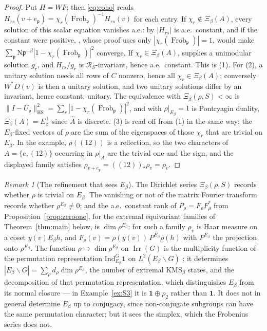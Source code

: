 \documentclass[11pt]{amsart}
\numberwithin{equation}{section}
\theoremstyle{definition}
\theoremstyle{remark}
\newtheorem{remark}[theorem]{Remark}
\newcommand{\cR}{\mathcal{R}}
\newcommand{\pp}{\mathfrak{p}}
\newcommand{\Ns}{\mathrm{N}}
\newcommand{\Frob}{\operatorname{Frob}}
\newcommand{\Irr}{\operatorname{Irr}}
\newcommand{\HS}{\mathrm{HS}}
\begin{document}
\begin{proof}
Put $H=WF$; then \eqref{eq:coho} reads $H_{rs}(v+e_\pp)=\chi_r(\Frob_\pp)^{-1}H_{rs}(v)$ for
each entry. If $\chi_r\notin\Xi_\beta(A)$, every solution of this scalar equation vanishes
a.e.: by \cite[Lem.~3.1]{Main} $|H_{rs}|$ is a.e.\ constant, and if the constant were
positive, \cite[Prop.~3.3]{Main}, whose proof uses only $|\chi_r(\Frob_\pp)|=1$, would make
$\sum_\pp\Ns\pp^{-\beta}|1-\chi_r(\Frob_\pp)|^2$ converge. If $\chi_r\in\Xi_\beta(A)$,
\cite[Prop.~3.4]{Main} supplies a unimodular solution $g_r$, and $H_{rs}/g_r$ is
$\cR_S$-invariant, hence a.e.\ constant. This is (1). For (2), a unitary solution needs all
rows of $C$ nonzero, hence all $\chi_r\in\Xi_\beta(A)$; conversely $W^*D(v)$ is then a
unitary solution, and two unitary solutions differ by an invariant, hence constant, unitary.
The equivalence with $\Xi_\beta(\rho,S)<\infty$ is $\|I-U_\pp\|_{\HS}^2=\sum_r|1-\chi_r(\Frob_\pp)|^2$,
and with $\rho|_{E_\beta}=1$ is Pontryagin duality, $\Xi_\beta(A)=E_\beta^\perp$ since
$\widehat A$ is discrete. (3) is read off from (1) in the same way; the $E_\beta$-fixed
vectors of $\rho$ are the sum of the eigenspaces of those $\chi_r$ that are trivial on
$E_\beta$. In the example, $\rho((12))$ is a reflection, so the two characters of
$A=\{e,(12)\}$ occurring in $\rho|_A$ are the trivial one and the sign, and the
displayed family satisfies $\rho_{v+e_\pp}=((12))_*\rho_v=\rho_v$.
\end{proof}

\begin{remark}[The refinement that sees $E_\beta$]\label{rem:fixed}
The Dirichlet series $\Xi_\beta(\rho,S)$ records whether $\rho$ is trivial on $E_\beta$.
The vanishing or not of the matrix Fourier transform records whether $\rho^{E_\beta}\ne0$;
and the a.e.\ constant rank of $P_\rho=F_\rho F_\rho^*$ from Proposition~\ref{prop:zeroone},
for the extremal equivariant families of Theorem~\ref{thm:main} below, is
$\dim\rho^{E_\beta}$: for such a family $\rho_v$ is Haar measure on a coset $y(v)E_\beta h$,
and $F_\rho(v)=\rho(y(v))\,P^{E_\beta}\rho(h)$ with $P^{E_\beta}$ the projection onto
$\rho^{E_\beta}$. The function $\rho\mapsto\dim\rho^{E_\beta}$ on $\Irr(G)$ is the multiplicity function
of the permutation representation $\mathrm{Ind}_{E_\beta}^G\mathbf 1$ on $L^2(E_\beta\backslash G)$
\cite{Mackey}: it determines $|E_\beta\backslash G|=\sum_\rho d_\rho\dim\rho^{E_\beta}$, the
number of extremal $\mathrm{KMS}_\beta$ states, and the decomposition of that permutation
representation, which distinguishes $E_\beta$ from its normal closure --- in
Example~\ref{ex:S3} it is $\mathbf 1\oplus\rho_2$ rather than $\mathbf 1$. It does not in
general determine $E_\beta$ up to conjugacy, since non-conjugate subgroups can have the
same permutation character; but it sees the simplex, which the Frobenius series does not.
\end{remark}
\end{document}

